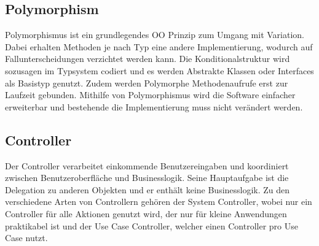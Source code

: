 \subsection{Polymorphism}
Polymorphismus ist ein grundlegendes OO Prinzip zum Umgang mit Variation.
Dabei erhalten Methoden je nach Typ eine andere Implementierung, wodurch auf Fallunterscheidungen verzichtet werden kann.
Die Konditionalstruktur wird sozusagen im Typsystem codiert und es werden Abstrakte Klassen oder Interfaces als Basistyp genutzt.
Zudem werden Polymorphe Methodenaufrufe erst zur Laufzeit gebunden.
Mithilfe von Polymorphismus wird die Software einfacher erweiterbar und bestehende die Implementierung muss nicht verändert werden.
\subsection{Controller}
Der Controller verarbeitet einkommende Benutzereingaben und koordiniert zwischen Benutzeroberfläche und Businesslogik.
Seine Hauptaufgabe ist die Delegation zu anderen Objekten und er enthält keine Businesslogik.
Zu den verschiedene Arten von Controllern gehören der System Controller, wobei nur ein Controller für alle Aktionen genutzt wird, der nur für kleine Anwendungen praktikabel ist
und der Use Case Controller, welcher einen Controller pro Use Case nutzt.
